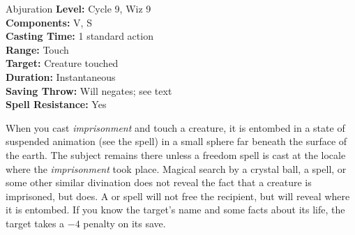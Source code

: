 {Abjuration}
{
	\textbf{Level:}
	Cycle 9, Wiz 9\\
	\textbf{Components:}
	V, S\\
	\textbf{Casting Time:}
	1 standard action\\
	\textbf{Range:}
	Touch\\
	\textbf{Target:}
	Creature touched\\
	\textbf{Duration:}
	Instantaneous\\
	\textbf{Saving Throw:}
	Will negates; see text\\
	\textbf{Spell Resistance:}
	Yes\\
}
{
	When you cast \emph{imprisonment} and touch a creature, it is entombed in a state of suspended animation (see the  spell) in a small sphere far beneath the surface of the earth. The subject remains there unless a freedom spell is cast at the locale where the \emph{imprisonment} took place. Magical search by a crystal ball, a  spell, or some other similar divination does not reveal the fact that a creature is imprisoned, but  does. A  or  spell will not free the recipient, but will reveal where it is entombed. If you know the target's name and some facts about its life, the target takes a $-4$ penalty on its save.

}
